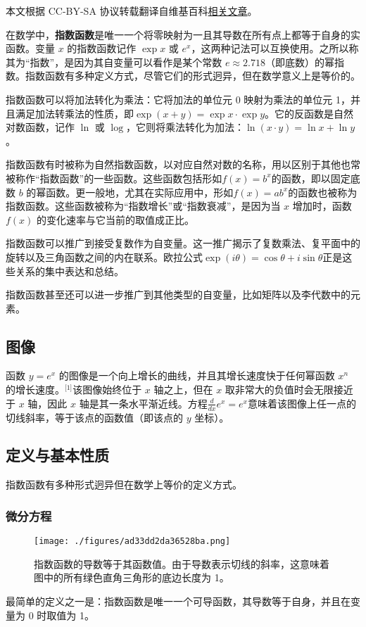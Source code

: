
本文根据 CC-BY-SA 协议转载翻译自维基百科\href{https://en.wikipedia.org/wiki/Exponential_function}{相关文章}。

在数学中，\textbf{指数函数}是唯一一个将零映射为一且其导数在所有点上都等于自身的实函数。变量 $x$ 的指数函数记作 $\exp x$ 或 $e^x$，这两种记法可以互换使用。之所以称其为“指数”，是因为其自变量可以看作是某个常数 $e \approx 2.718$（即底数）的幂指数。指数函数有多种定义方式，尽管它们的形式迥异，但在数学意义上是等价的。

指数函数可以将加法转化为乘法：它将加法的单位元 0 映射为乘法的单位元 1，并且满足加法转乘法的性质，即$\exp(x + y) = \exp x \cdot \exp y$。它的反函数是自然对数函数，记作 $\ln$ 或 $\log$，它则将乘法转化为加法：$\ln(x \cdot y) = \ln x + \ln y$。

指数函数有时被称为自然指数函数，以对应自然对数的名称，用以区别于其他也常被称作“指数函数”的一些函数。这些函数包括形如$f(x) = b^x$的函数，即以固定底数 $b$ 的幂函数。更一般地，尤其在实际应用中，形如$f(x) = a b^x$的函数也被称为指数函数。这些函数被称为“指数增长”或“指数衰减”，是因为当 $x$ 增加时，函数 $f(x)$ 的变化速率与它当前的取值成正比。

指数函数可以推广到接受复数作为自变量。这一推广揭示了复数乘法、复平面中的旋转以及三角函数之间的内在联系。欧拉公式$\exp(i\theta) = \cos\theta + i\sin\theta$正是这些关系的集中表达和总结。

指数函数甚至还可以进一步推广到其他类型的自变量，比如矩阵以及李代数中的元素。
\subsection{图像}
函数 $y = e^x$ 的图像是一个向上增长的曲线，并且其增长速度快于任何幂函数 $x^n$ 的增长速度。\(^\text{[1]}\)该图像始终位于 $x$ 轴之上，但在 $x$ 取非常大的负值时会无限接近于 $x$ 轴，因此 $x$ 轴是其一条水平渐近线。方程$\frac{d}{dx}e^x = e^x$意味着该图像上任一点的切线斜率，等于该点的函数值（即该点的 $y$ 坐标）。
\subsection{定义与基本性质}
指数函数有多种形式迥异但在数学上等价的定义方式。
\subsubsection{微分方程}
\begin{figure}[ht]
\centering
\texttt{[image: ./figures/ad33dd2da36528ba.png]}
\caption{指数函数的导数等于其函数值。由于导数表示切线的斜率，这意味着图中的所有绿色直角三角形的底边长度为 1。} \label{fig_ZShs_1}
\end{figure}
最简单的定义之一是：指数函数是唯一一个可导函数，其导数等于自身，并且在变量为 0 时取值为 1。

